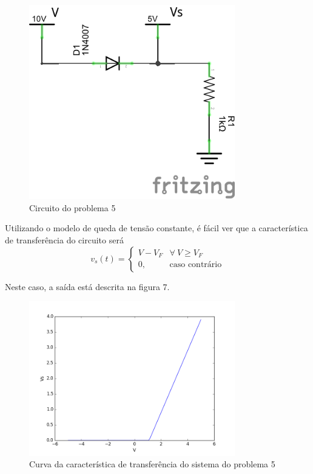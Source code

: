 \documentclass[12pt, a4paper, twoside]{article}
\begin{document}
\begin{figure}
    \centering
    \includegraphics[width=0.8\textwidth]{figs/rel3/c2.png}
    \caption{Circuito do problema 5}
\end{figure}

Utilizando o modelo de queda de tensão constante, é fácil ver que a característica
de transferência do circuito será
\begin{equation}
    v_s(t) =
    \begin{cases}
        V - V_F & \forall\ V \geq V_F \\
        0, & \text{caso contrário}
    \end{cases}
\end{equation}

Neste caso, a saída está descrita na figura 7.

\begin{figure}
    \centering
    \includegraphics[width=0.8\textwidth]{figs/rel3/ex5.png}
    \caption{Curva da característica de transferência do sistema do problema 5}
\end{figure}
\end{document}

